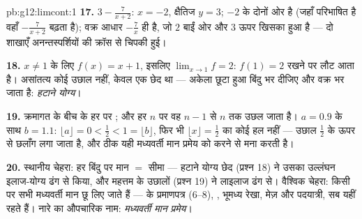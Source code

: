 \begin{solution}{pb:g12:limcont:1}
\textbf{17.} $3 - \frac{7}{x + 2}$:  $x = -2$, क्षैतिज $y = 3$; $-2$ के
दोनों ओर   है (जहाँ परिभाषित है वहाँ $-\frac{7}{x+2}$ बढ़ता है); वक्र आधार
 $-\frac7x$ ही है, जो $2$ बाईं ओर और $3$ ऊपर खिसका हुआ है --- दो
शाखाएँ अनन्तस्पर्शियों की क्रॉस से चिपकी हुई।

\textbf{18.} $x \neq 1$ के लिए $f(x) = x + 1$, इसलिए $\lim_{x \to 1} f = 2$: $f(1) = 2$ रखने पर  लौट आता
है। असांतत्य कोई उछाल नहीं, केवल एक छेद था --- अकेला छूटा हुआ बिंदु भर दीजिए
और वक्र भर जाता है: \emph{हटाने योग्य}।

\textbf{19.} क्रमागत  के बीच के हर  पर ; और हर 
$n$ पर वह $n - 1$ से $n$ तक उछल जाता है। $a = 0.9$ के साथ $b = 1.1$: $\lfloor a \rfloor = 0 < \frac12 <
1 = \lfloor b \rfloor$, फिर भी
$\lfloor x \rfloor = \frac12$ का कोई हल नहीं --- उछाल $\frac12$ के ऊपर से छलाँग लगा जाता है, और ठीक यही
मध्यवर्ती मान प्रमेय   को करने से मना करती है।

\textbf{20.} स्थानीय चेहरा: हर बिंदु पर मान $=$ सीमा --- हटाने योग्य छेद
(प्रश्न 18) ने उसका उल्लंघन इलाज-योग्य ढंग से किया, और महत्तम   के
उछालों (प्रश्न 19) ने लाइलाज ढंग से। वैश्विक चेहरा: किसी  पर सभी
मध्यवर्ती मान छू लिए जाते हैं ---  के प्रमाणपत्र (6--8), ,
भूमध्य रेखा, मेज़ और पदयात्री, सब यहीं रहते हैं। नारे का औपचारिक नाम:
\emph{मध्यवर्ती मान प्रमेय}।
\end{solution}
